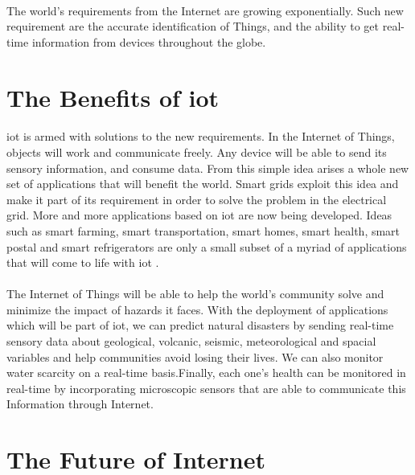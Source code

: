 \documentclass[12pt,a4paper,final]{report}
\begin{document}
\paragraph{}
The world's requirements from the Internet are growing exponentially. Such new requirement are the accurate identification of Things, and the ability to get real-time information from devices throughout the globe.
\paragraph{}

\section{The Benefits of \gls{iot}}
\paragraph{}
\gls{iot} is armed with solutions to the new requirements. In the Internet of Things, objects will work and communicate freely. Any device will be able to send its sensory information, and consume data. From this simple idea arises a whole new set of applications that will benefit the world. Smart grids exploit this idea and make it part of its requirement in order to solve the problem in the electrical grid\cite{ref8}. More and more applications based on \gls{iot} are now being developed. Ideas such as smart farming, smart transportation, smart homes, smart health, smart postal and smart refrigerators are only a small subset of a myriad of applications that will come to life with \gls{iot} \cite{ref19}.
\paragraph{}
The Internet of Things will be able to help the world's community solve and minimize the impact of hazards it faces. With the deployment of applications which will be part of \gls{iot}, we can predict natural disasters by sending real-time sensory data about geological, volcanic, seismic, meteorological and spacial variables and help communities avoid losing their lives. We can also monitor water scarcity on a real-time basis.Finally, each one's health can be monitored in real-time by incorporating microscopic sensors that are able to communicate this Information through Internet.

\section{The Future of Internet}
\end{document}
